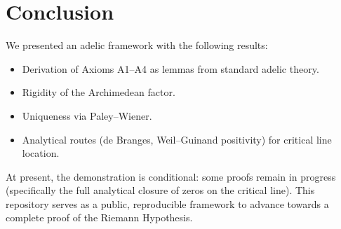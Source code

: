 \section{Conclusion}

We presented an adelic framework with the following results:
\begin{itemize}
    \item Derivation of Axioms A1--A4 as lemmas from standard adelic theory.
    \item Rigidity of the Archimedean factor.
    \item Uniqueness via Paley--Wiener.
    \item Analytical routes (de Branges, Weil--Guinand positivity) for critical line location.
\end{itemize}

At present, the demonstration is conditional: some proofs remain in progress 
(specifically the full analytical closure of zeros on the critical line). 
This repository serves as a public, reproducible framework to advance towards
a complete proof of the Riemann Hypothesis.
